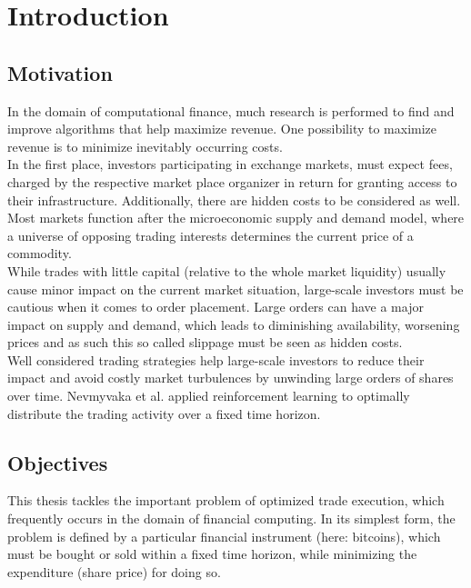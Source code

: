 \chapter{Introduction}
\label{chap:introduction}
\section{Motivation} 
\label{sec:motivation}
In the domain of computational finance, much research is performed to find and improve algorithms that help maximize revenue. One possibility to maximize revenue is to minimize inevitably occurring costs. \\

In the first place, investors participating in exchange markets, must expect fees, charged by the respective market place organizer in return for granting access to their infrastructure. Additionally, there are hidden costs to be considered as well. Most markets function after the microeconomic supply and demand \cite{todo} model, where a universe of opposing trading interests determines the current price of a commodity.\\

While trades with little capital (relative to the whole market liquidity) usually cause minor impact on the current market situation, large-scale investors must be cautious when it comes to order placement. Large orders can have a major impact on supply and demand, which leads to diminishing availability, worsening prices and as such this so called slippage must be seen as hidden costs. \\

Well considered trading strategies help large-scale investors to reduce their impact and avoid costly market turbulences by unwinding large orders of shares over time. 
Nevmyvaka et al. \cite{Nevmyvaka:2006} applied reinforcement learning to optimally distribute the trading activity over a fixed time horizon.\\

\section{Objectives}
\label{sec:objectives}
This thesis tackles the important problem of optimized trade execution, which frequently occurs in the domain of financial computing. In its simplest form, the problem is defined by a particular financial instrument (here: bitcoins), which must be bought or sold within a fixed time horizon, while minimizing the expenditure (share price) for doing so.\\


